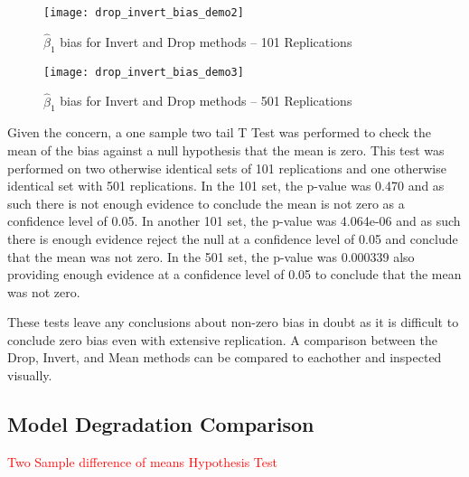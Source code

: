 \documentclass[../paper.tex]{subfiles}
\begin{document}
\begin{figure}[H]

\centering
\texttt{[image: drop\_invert\_bias\_demo2]}
\caption{$\hat{\beta}_{1}$ bias for Invert and Drop methods -- 101 Replications}
\label{fig:drop_invert_bias_demo2}
\end{figure}

\begin{figure}[H]

\centering
\texttt{[image: drop\_invert\_bias\_demo3]}
\caption{$\hat{\beta}_{1}$  bias for Invert and Drop methods -- 501 Replications}
\label{fig:drop_invert_bias_demo3}
\end{figure}

Given the concern, a one sample two tail T Test was performed to check the mean of the bias against a null hypothesis that the mean is zero.
This test was performed on two otherwise identical sets of 101 replications and one otherwise identical set with 501 replications.
In the 101 set, the p-value was 0.470 and as such there is not enough evidence to conclude the mean is not zero as a confidence level of 0.05.
In another 101 set, the p-value was 4.064e-06 and as such there is enough evidence reject the null at a confidence level of 0.05 and conclude that the mean was not zero.
In the 501 set, the p-value was 0.000339 also providing enough evidence at a confidence level of 0.05 to conclude that the mean was not zero.

These tests leave any conclusions about non-zero bias in doubt as it is difficult to conclude zero bias even with extensive replication. A comparison between the Drop, Invert, and Mean methods can be compared to eachother and inspected visually.

\subsection{Model Degradation Comparison}

\textcolor{red}{Two Sample difference of means Hypothesis Test}

\end{document}
